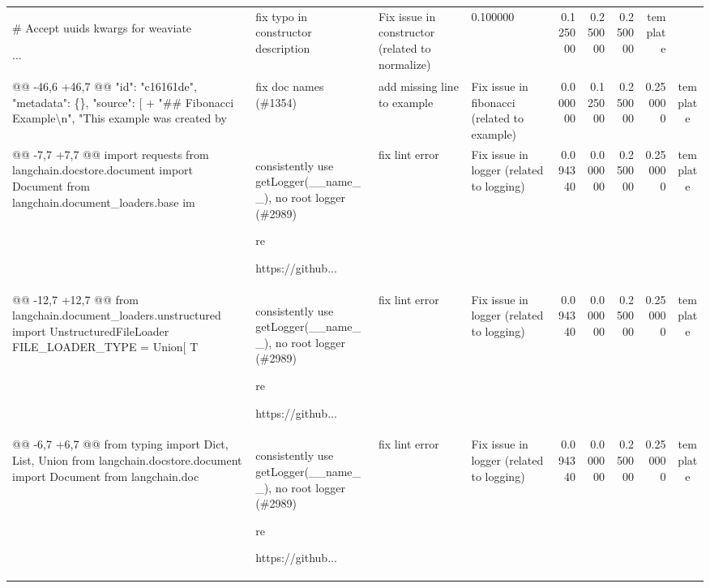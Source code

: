 \begin{table}
\begin{tabular}{p{3cm}p{2.2cm}p{2.2cm}p{2.2cm}rrrrc}
\# Accept uuids kwargs for weaviate



... & fix typo in constructor description & Fix issue in constructor (related to normalize) & 0.100000 & 0.125000 & 0.250000 & 0.250000 & template \\
@@ -46,6 +46,7 @@ "id": "c16161de", "metadata": \{\}, "source": [ + "\#\# Fibonacci Example\textbackslash n", "This example was created by & fix doc names (\#1354) & add missing line to example & Fix issue in fibonacci (related to example) & 0.000000 & 0.125000 & 0.250000 & 0.250000 & template \\
@@ -7,7 +7,7 @@ import requests from langchain.docstore.document import Document from langchain.document\_loaders.base im & consistently use getLogger(\_\_name\_\_), no root logger (\#2989)

re

https://github... & fix lint error & Fix issue in logger (related to logging) & 0.094340 & 0.000000 & 0.250000 & 0.250000 & template \\
@@ -12,7 +12,7 @@ from langchain.document\_loaders.unstructured import UnstructuredFileLoader FILE\_LOADER\_TYPE = Union[ T & consistently use getLogger(\_\_name\_\_), no root logger (\#2989)

re

https://github... & fix lint error & Fix issue in logger (related to logging) & 0.094340 & 0.000000 & 0.250000 & 0.250000 & template \\
@@ -6,7 +6,7 @@ from typing import Dict, List, Union from langchain.docstore.document import Document from langchain.doc & consistently use getLogger(\_\_name\_\_), no root logger (\#2989)

re

https://github... & fix lint error & Fix issue in logger (related to logging) & 0.094340 & 0.000000 & 0.250000 & 0.250000 & template \\
\bottomrule
\end{tabular}
\end{table}
